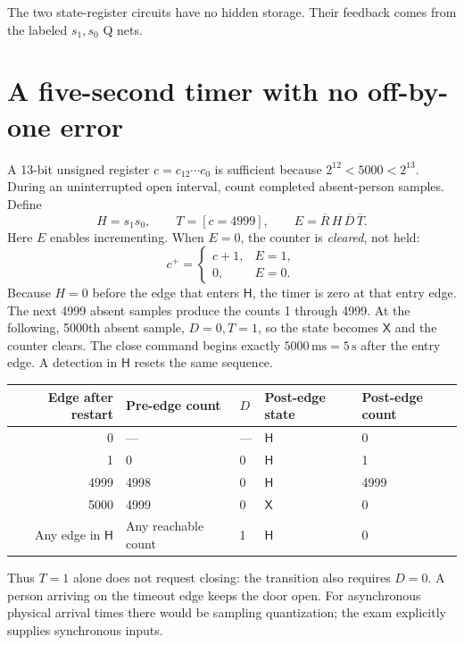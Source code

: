 \begin{center}
\end{center}
The two state-register circuits have no hidden storage. Their feedback
comes from the labeled \(s_1,s_0\) Q nets.

\clearpage
\section{A five-second timer with no off-by-one error}
A 13-bit unsigned register \(c=c_{12}\cdots c_0\) is sufficient because
\(2^{12}<5000<2^{13}\). During an uninterrupted open interval, count
completed absent-person samples. Define
\[
H=s_1s_0,\qquad
T=[c=4999],\qquad
E=\overline R\,H\,\overline D\,\overline T.
\]
Here \(E\) enables incrementing. When \(E=0\), the counter is
\emph{cleared}, not held:
\[
\boxed{c^+=
\begin{cases}
c+1,&E=1,\\
0,&E=0.
\end{cases}}
\]
Because \(H=0\) before the edge that enters \(\mathsf H\), the timer is
zero at that entry edge. The next 4999 absent samples produce the counts
1 through 4999. At the following, 5000th absent sample,
\(D=0,T=1\), so the state becomes \(\mathsf X\) and the counter clears.
The close command begins exactly \(5000\,\mathrm{ms}=5\,\mathrm{s}\)
after the entry edge. A detection in \(\mathsf H\) resets the same
sequence.

\begin{center}
\begin{tabular}{rllll}
\toprule
Edge after restart & Pre-edge count & \(D\) & Post-edge state & Post-edge count\\
\midrule
0 & --- & --- & \(\mathsf H\) & 0\\
1 & 0 & 0 & \(\mathsf H\) & 1\\
4999 & 4998 & 0 & \(\mathsf H\) & 4999\\
5000 & 4999 & 0 & \(\mathsf X\) & 0\\
\midrule
Any edge in \(\mathsf H\) & Any reachable count & 1 & \(\mathsf H\) & 0\\
\bottomrule
\end{tabular}
\end{center}
Thus \(T=1\) alone does not request closing: the transition also requires
\(D=0\). A person arriving on the timeout edge keeps the door open.
For asynchronous physical arrival times there would be sampling
quantization; the exam explicitly supplies synchronous inputs.

